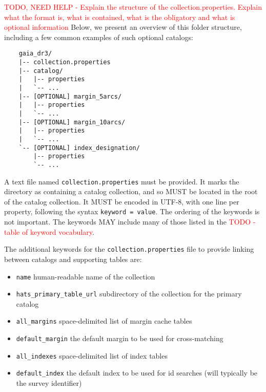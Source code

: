 \documentclass[11pt,a4paper]{ivoa}
\begin{document}
\textcolor{red}{TODO, NEED HELP -  Explain the structure of the collection.properties. Explain what the format is, what is contained, what is the obligatory and what is optional information}
Below, we present an overview of this folder structure, including a few common examples of such optional catalogs:
    
    \begin{verbatim}
    gaia_dr3/
    |-- collection.properties
    |-- catalog/
    |   |-- properties
    |   `-- ...
    |-- [OPTIONAL] margin_5arcs/
    |   |-- properties
    |   `-- ...
    |-- [OPTIONAL] margin_10arcs/
    |   |-- properties
    |   `-- ...
    `-- [OPTIONAL] index_designation/
        |-- properties
        `-- ...
    \end{verbatim}    


    A text file named \texttt{collection.properties} must be provided. 
    It marks the directory as containing a catalog collection, and so MUST be located in the 
    root of the catalog collection.
    It MUST be encoded in UTF-8, with one line per property, following the syntax \texttt{keyword = value}.
    The ordering of the keywords is not important. The keywords MAY include many of those listed in the \textcolor{red}{TODO - table of keyword vocabulary}.
    
    The additional keywords for the \texttt{collection.properties} file to provide linking between catalogs and supporting tables are:

    \begin{itemize}
        \item \texttt{name} human-readable name of the collection
        \item \texttt{hats\_primary\_table\_url} subdirectory of the collection for the primary catalog
        \item \texttt{all\_margins} space-delimited list of margin cache tables
        \item \texttt{default\_margin} the default margin to be used for cross-matching
        \item \texttt{all\_indexes} space-delimited list of index tables
        \item \texttt{default\_index} the default index to be used for id searches (will typically be the survey identifier)
    \end{itemize}
    
\end{document}
